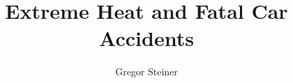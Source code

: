 \documentclass[11pt]{article}
\title{Extreme Heat and Fatal Car Accidents}
\author{Gregor Steiner}
\begin{document}
\maketitle

\begin{abstract}
\end{abstract}















\end{document}
